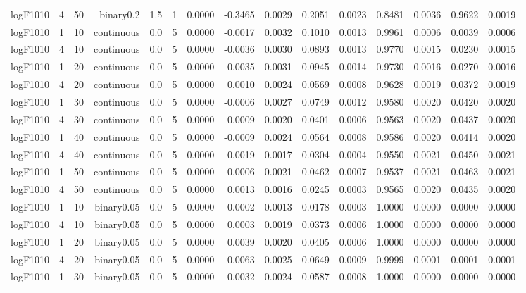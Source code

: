 \begin{longtable}{rrrrrrrrrrrrrrr}
  logF1010 & 4 & 50 & binary0.2 & 1.5 & 1 & 0.0000 & -0.3465 & 0.0029 & 0.2051 & 0.0023 & 0.8481 & 0.0036 & 0.9622 & 0.0019 \\ 
  logF1010 & 1 & 10 & continuous & 0.0 & 5 & 0.0000 & -0.0017 & 0.0032 & 0.1010 & 0.0013 & 0.9961 & 0.0006 & 0.0039 & 0.0006 \\ 
  logF1010 & 4 & 10 & continuous & 0.0 & 5 & 0.0000 & -0.0036 & 0.0030 & 0.0893 & 0.0013 & 0.9770 & 0.0015 & 0.0230 & 0.0015 \\ 
  logF1010 & 1 & 20 & continuous & 0.0 & 5 & 0.0000 & -0.0035 & 0.0031 & 0.0945 & 0.0014 & 0.9730 & 0.0016 & 0.0270 & 0.0016 \\ 
  logF1010 & 4 & 20 & continuous & 0.0 & 5 & 0.0000 & 0.0010 & 0.0024 & 0.0569 & 0.0008 & 0.9628 & 0.0019 & 0.0372 & 0.0019 \\ 
  logF1010 & 1 & 30 & continuous & 0.0 & 5 & 0.0000 & -0.0006 & 0.0027 & 0.0749 & 0.0012 & 0.9580 & 0.0020 & 0.0420 & 0.0020 \\ 
  logF1010 & 4 & 30 & continuous & 0.0 & 5 & 0.0000 & 0.0009 & 0.0020 & 0.0401 & 0.0006 & 0.9563 & 0.0020 & 0.0437 & 0.0020 \\ 
  logF1010 & 1 & 40 & continuous & 0.0 & 5 & 0.0000 & -0.0009 & 0.0024 & 0.0564 & 0.0008 & 0.9586 & 0.0020 & 0.0414 & 0.0020 \\ 
  logF1010 & 4 & 40 & continuous & 0.0 & 5 & 0.0000 & 0.0019 & 0.0017 & 0.0304 & 0.0004 & 0.9550 & 0.0021 & 0.0450 & 0.0021 \\ 
  logF1010 & 1 & 50 & continuous & 0.0 & 5 & 0.0000 & -0.0006 & 0.0021 & 0.0462 & 0.0007 & 0.9537 & 0.0021 & 0.0463 & 0.0021 \\ 
  logF1010 & 4 & 50 & continuous & 0.0 & 5 & 0.0000 & 0.0013 & 0.0016 & 0.0245 & 0.0003 & 0.9565 & 0.0020 & 0.0435 & 0.0020 \\ 
  logF1010 & 1 & 10 & binary0.05 & 0.0 & 5 & 0.0000 & 0.0002 & 0.0013 & 0.0178 & 0.0003 & 1.0000 & 0.0000 & 0.0000 & 0.0000 \\ 
  logF1010 & 4 & 10 & binary0.05 & 0.0 & 5 & 0.0000 & 0.0003 & 0.0019 & 0.0373 & 0.0006 & 1.0000 & 0.0000 & 0.0000 & 0.0000 \\ 
  logF1010 & 1 & 20 & binary0.05 & 0.0 & 5 & 0.0000 & 0.0039 & 0.0020 & 0.0405 & 0.0006 & 1.0000 & 0.0000 & 0.0000 & 0.0000 \\ 
  logF1010 & 4 & 20 & binary0.05 & 0.0 & 5 & 0.0000 & -0.0063 & 0.0025 & 0.0649 & 0.0009 & 0.9999 & 0.0001 & 0.0001 & 0.0001 \\ 
  logF1010 & 1 & 30 & binary0.05 & 0.0 & 5 & 0.0000 & 0.0032 & 0.0024 & 0.0587 & 0.0008 & 1.0000 & 0.0000 & 0.0000 & 0.0000 \\ 

\end{longtable}
